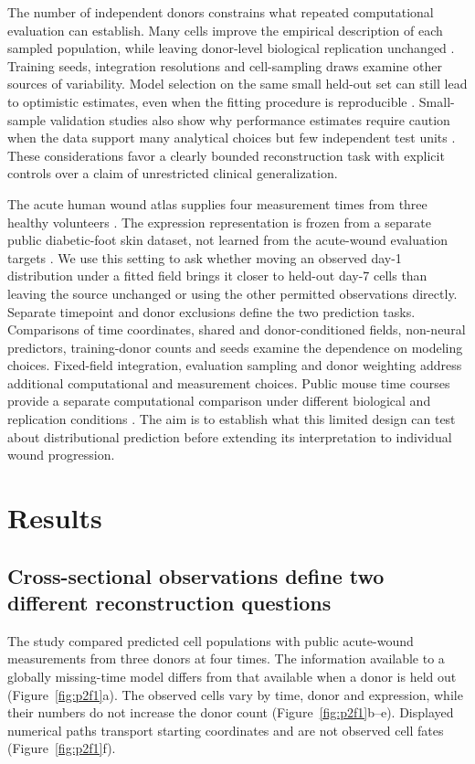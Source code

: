 \documentclass[10pt,a4paper]{article}
\begin{document}
The number of independent donors constrains what repeated computational evaluation can establish. Many cells improve the empirical description of each sampled population, while leaving donor-level biological replication unchanged \citep{zimmerman2021}. Training seeds, integration resolutions and cell-sampling draws examine other sources of variability. Model selection on the same small held-out set can still lead to optimistic estimates, even when the fitting procedure is reproducible \citep{varma2006,cawley2010}. Small-sample validation studies also show why performance estimates require caution when the data support many analytical choices but few independent test units \citep{vabalas2019}. These considerations favor a clearly bounded reconstruction task with explicit controls over a claim of unrestricted clinical generalization.

The acute human wound atlas supplies four measurement times from three healthy volunteers \citep{liu2025_wound,geo_gse241132}. The expression representation is frozen from a separate public diabetic-foot skin dataset, not learned from the acute-wound evaluation targets \citep{theocharidis2022}. We use this setting to ask whether moving an observed day-1 distribution under a fitted field brings it closer to held-out day-7 cells than leaving the source unchanged or using the other permitted observations directly. Separate timepoint and donor exclusions define the two prediction tasks. Comparisons of time coordinates, shared and donor-conditioned fields, non-neural predictors, training-donor counts and seeds examine the dependence on modeling choices. Fixed-field integration, evaluation sampling and donor weighting address additional computational and measurement choices. Public mouse time courses provide a separate computational comparison under different biological and replication conditions \citep{geo_gse326622}. The aim is to establish what this limited design can test about distributional prediction before extending its interpretation to individual wound progression.

\section{Results}
\subsection{Cross-sectional observations define two different reconstruction questions}
The study compared predicted cell populations with public acute-wound measurements from three donors at four times. The information available to a globally missing-time model differs from that available when a donor is held out (Figure~\ref{fig:p2f1}a). The observed cells vary by time, donor and expression, while their numbers do not increase the donor count (Figure~\ref{fig:p2f1}b--e). Displayed numerical paths transport starting coordinates and are not observed cell fates (Figure~\ref{fig:p2f1}f).
\end{document}
